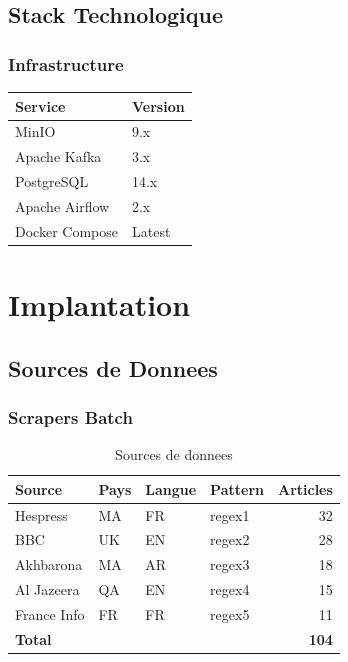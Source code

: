 \documentclass[12pt,a4paper]{report}
\begin{document}
\section{Stack Technologique}

\subsection{Infrastructure}

\begin{table}[H]
\centering
\begin{tabular}{ll}
\toprule
\textbf{Service} & \textbf{Version} \\
\midrule
MinIO & 9.x \\
Apache Kafka & 3.x \\
PostgreSQL & 14.x \\
Apache Airflow & 2.x \\
Docker Compose & Latest \\
\bottomrule
\end{tabular}
\end{table}


\chapter{Implantation}

\section{Sources de Donnees}

\subsection{Scrapers Batch}

\begin{table}[H]
\centering
\begin{tabular}{llllr}
\toprule
\textbf{Source} & \textbf{Pays} & \textbf{Langue} & \textbf{Pattern} & \textbf{Articles} \\
\midrule
Hespress & MA & FR & regex1 & 32 \\
BBC & UK & EN & regex2 & 28 \\
Akhbarona & MA & AR & regex3 & 18 \\
Al Jazeera & QA & EN & regex4 & 15 \\
France Info & FR & FR & regex5 & 11 \\
\midrule
\textbf{Total} & & & & \textbf{104} \\
\bottomrule
\end{tabular}
\caption{Sources de donnees}
\end{table}
\end{document}
